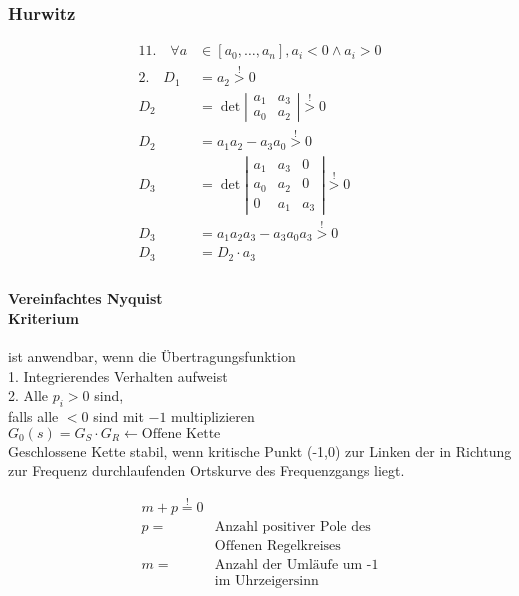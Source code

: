 \documentclass{article}
\begin{document}
\begin{landscape}
\begin{multicols}{2}
\begin{multicols}{2}
\begin{multicols}{2}
\subsubsection*{Hurwitz}
\begin{alignat*}
	11. \quad \forall a &\in \left[a_0, \ldots,  a_n\right] , a_i<0 \wedge a_i>0 \\
	2. \quad D_1 &= a_2 \overset{!}{>} 0 \\
	D_{2} &=\operatorname{det}\left|
		\begin{array}{ll}a_{1} & a_{3} \\ 
		a_{0} & a_{2}
	\end{array}\right| \overset{!}{>}0\\
	D_{2} &=a_{1} a_{2}-a_{3} a_{0}\overset{!}{>}0 \\
	D_{3} &=\operatorname{det}\left|
		\begin{array}{lll}a_{1} & a_{3} & 0 \\
				  a_{0} & a_{2} & 0 \\
		                  0 & a_{1} & a_{3}
		\end{array}
		\right| \overset{!}{>} 0\\
	D_{3} &=a_{1} a_{2} a_{3}-a_{3} a_{0} a_{3}\overset{!}{>}0 \\
	D_3 & = D_2 \cdot a_3 \\
\end{alignat*}

\paragraph{Vereinfachtes Nyquist \\ Kriterium} ist anwendbar, wenn die Übertragungsfunktion \\
1. Integrierendes Verhalten aufweist \\
2. Alle $p_i > 0$ sind,\\ falls alle $< 0$ sind mit $-1$ multiplizieren \\
$G_0(s) = G_S \cdot G_R \leftarrow \text{Offene Kette}$ \\
Geschlossene Kette stabil, wenn kritische Punkt (-1,0) zur Linken der in Richtung zur Frequenz durchlaufenden Ortskurve des Frequenzgangs liegt.

\begin{align*}
	m + p \overset{!}{=} 0 \\
	p = &\text{Anzahl positiver Pole des} \\ & \text{Offenen Regelkreises} \\
	m = &\text{Anzahl der Umläufe um -1} \\ &\text{im Uhrzeigersinn} \\
\end{align*}


\end{multicols}
\end{multicols}
\end{multicols}
\end{landscape}
\end{document}
